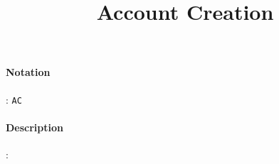 \documentclass[10pt,a4paper,oneside]{scrartcl}
\title{Account Creation}
\date{}
\begin{document}
\maketitle
\paragraph{Notation}: \texttt{AC}
\paragraph{Description}: 
\par
\end{document}
